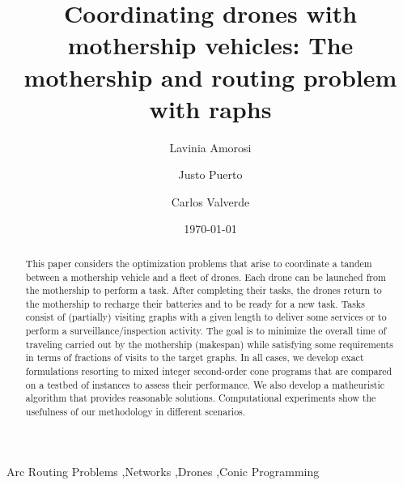 \documentclass[10pt,a4paper]{elsarticle}
\title{Coordinating drones with mothership vehicles: The mothership and \EN{multiple-drone} routing problem with \EN{g}raphs}
\author[1]{Lavinia Amorosi\corref{cor1}}
\author[2]{Justo Puerto\corref{cor1}}
\author[2]{Carlos Valverde\corref{cor1}}
\date{\today}
\newcommand{\EN}[1]{{\color{black}#1}}
\begin{document}
\begin{abstract}
This paper considers the optimization problems that arise to coordinate a tandem between a mothership vehicle and a fleet of drones. 
Each drone can be launched from the mothership to perform a task. After completing the\EN{ir} tasks, the drones return to the mothership to recharge the\EN{ir} batteries and to be ready for a new task. Tasks consist o\EN{f} (partially) visiting graphs with a given length to deliver some services or to perform \EN{a} surveillance/inspection activity.  The goal is to minimize the overall time of \EN{traveling carried out} by the mothership (makespan) while satisfying some requirements in terms of fractions of visits to the target graphs. In all cases, we develop exact formulations resorting to mixed integer second-order cone programs that are compared on a testbed of instances to assess their performance. We also develop a matheuristic algorithm that provides reasonable solutions.  Computational experiments show the usefulness of our methodology in different scenarios. 
\end{abstract}

\begin{keyword}
Arc Routing Problems \sep Networks \sep Drones \sep Conic Programming
\end{keyword}


\maketitle
\end{document}
